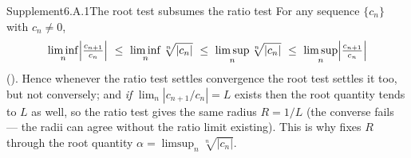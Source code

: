 \documentclass[main.tex]{subfiles}
\begin{document}
\lectureappendix

\begin{ObjL}{Supplement}{6.A.1}{The root test subsumes the ratio test}
For any sequence $\{c_n\}$ with $c_n\neq0$,
\[ \liminf_{n}\Bigl|\tfrac{c_{n+1}}{c_n}\Bigr|\ \le\ \liminf_n\sqrt[n]{|c_n|}\ \le\
   \limsup_n\sqrt[n]{|c_n|}\ \le\ \limsup_n\Bigl|\tfrac{c_{n+1}}{c_n}\Bigr| \]
(\R{3.37}). Hence whenever the ratio test settles convergence the root test settles it too, but
not conversely; and \emph{if} $\lim_n|c_{n+1}/c_n|=L$ exists then the root quantity tends to $L$
as well, so the ratio test gives the same radius $R=1/L$ (the converse fails --- the radii can
agree without the ratio limit existing). This is why \xref{6.6.11} fixes $R$ through the root
quantity $\alpha=\limsup_n\sqrt[n]{|c_n|}$.
\end{ObjL}

\ifSubfilesClassLoaded{\clearpage\objindex}{}
\end{document}
